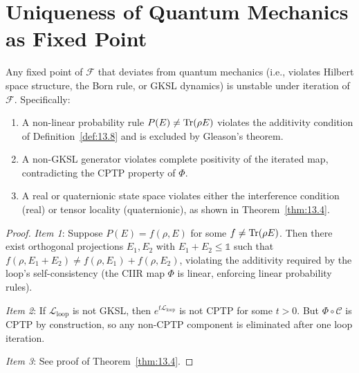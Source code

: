 \section{Uniqueness of Quantum Mechanics as Fixed Point}
\label{sec:ch13:uniqueness}

\begin{theorem}\label{thm:13.7}
Any fixed point of $\mathcal{F}$ that deviates from quantum mechanics
(i.e., violates Hilbert space structure, the Born rule, or GKSL dynamics)
is unstable under iteration of $\mathcal{F}$.  Specifically:
\begin{enumerate}
  \item A non-linear probability rule $P(E) \neq \mathrm{Tr}(\rho E)$ violates
    the additivity condition of Definition~\ref{def:13.8} and is
    excluded by Gleason's theorem.
  \item A non-GKSL generator violates complete positivity of the
    iterated map, contradicting the CPTP property of $\Phi$.
  \item A real or quaternionic state space violates either the
    interference condition (real) or tensor locality (quaternionic),
    as shown in Theorem~\ref{thm:13.4}.
\end{enumerate}
\end{theorem}

\begin{proof}
\emph{Item 1}: Suppose $P(E) = f(\rho, E)$ for some $f \neq \mathrm{Tr}(\rho E)$.
Then there exist orthogonal projections $E_1, E_2$ with $E_1 + E_2 \leq
\mathbb{1}$ such that $f(\rho, E_1 + E_2) \neq f(\rho, E_1) + f(\rho,
E_2)$, violating the additivity required by the loop's self-consistency
(the CIIR map $\Phi$ is linear, enforcing linear probability rules).

\emph{Item 2}: If $\mathcal{L}_{\mathrm{loop}}$ is not GKSL, then
$e^{t\mathcal{L}_{\mathrm{loop}}}$ is not CPTP for some $t > 0$.
But $\Phi \circ \mathcal{C}$ is CPTP by construction, so any
non-CPTP component is eliminated after one loop iteration.

\emph{Item 3}: See proof of Theorem~\ref{thm:13.4}.
\end{proof}

